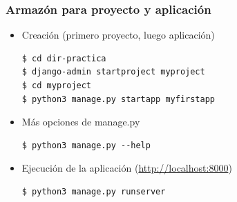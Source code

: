
%

\begin{frame}[fragile]
\frametitle{Armazón para proyecto y aplicación}

\begin{itemize}
\item Creación (primero proyecto, luego aplicación)
\begin{verbatim}
$ cd dir-practica
$ django-admin startproject myproject
$ cd myproject
$ python3 manage.py startapp myfirstapp
\end{verbatim}
\item Más opciones de manage.py
\begin{verbatim}
$ python3 manage.py --help
\end{verbatim}
\item Ejecución de la aplicación (\url{http://localhost:8000})
\begin{verbatim}
$ python3 manage.py runserver
\end{verbatim}

\end{itemize}

\end{frame}


